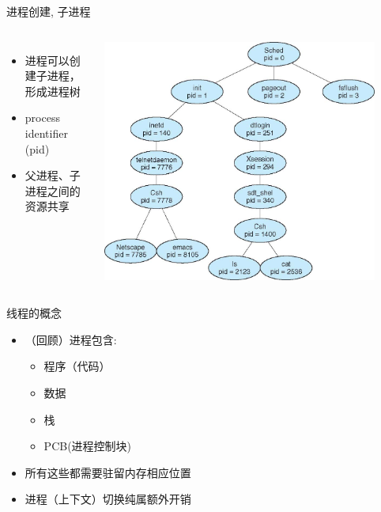 \documentclass[xcolor=svgnames]{beamer}
\begin{document}
\begin{CJK*}{UTF8}{gbsn}


\begin{frame}{进程创建, 子进程}
\begin{columns}%
\begin{itemize}
\item 进程可以创建子进程，形成进程树
\item process identifier (pid)
\item 父进程、子进程之间的资源共享
\end{itemize}
\includegraphics[width=0.9\textwidth]{tree.jpg}
\end{columns}%
\end{frame}

\begin{frame}{线程的概念}
\begin{itemize}
\item （回顾）进程包含:
\begin{itemize}
\item 程序（代码）
\item 数据
\item 栈
\item PCB(进程控制块)
\end{itemize}
\item 所有这些都需要驻留内存相应位置
\item 进程（上下文）切换纯属额外开销
\end{itemize}
\end{frame}


\end{CJK*}
\end{document}
